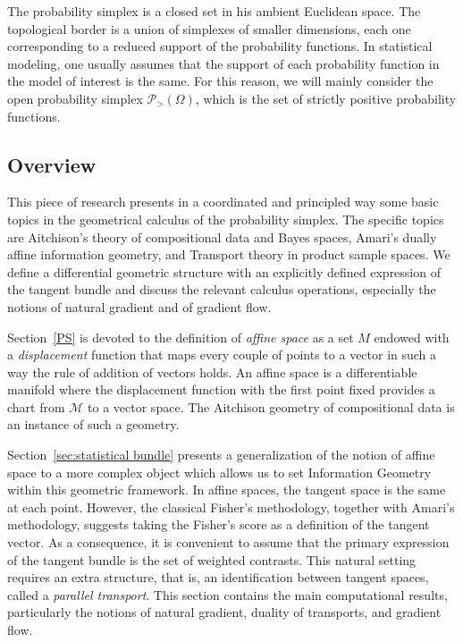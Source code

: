 \documentclass[axioms,article,submit,pdftex,moreauthors]{Definitions/mdpi}
\theoremstyle{plain}
\theoremstyle{remark}
\newcommand{\pdensitieson}[1]{\mathcal P_{>}\left(#1\right)}
\begin{document}
The probability simplex is a closed set in his ambient Euclidean space. The topological border is a union of simplexes of smaller dimensions, each one corresponding to a reduced support of the probability functions. In statistical modeling, one usually assumes that the support of each probability function in the model of interest is the same. For this reason, we will mainly consider the open probability simplex $\pdensitieson \Omega$, which is the set of strictly positive probability functions.


\subsection{Overview}

This piece of research presents in a coordinated and principled way some basic topics in the geometrical calculus of the probability simplex. The specific topics are Aitchison's theory of compositional data and Bayes spaces, Amari's dually affine information geometry, and Transport theory in product sample spaces. We define a differential geometric structure with an explicitly defined expression of the tangent bundle and discuss the relevant calculus operations, especially the notions of natural gradient and of gradient flow.

Section~\ref{PS} is devoted to the definition of \emph{affine space} as a set $M$ endowed with a \emph{displacement} function that maps every couple of points to a vector in such a way the rule of addition of vectors holds. An affine space is a differentiable manifold where the displacement function with the first point fixed provides a chart from $\mathcal{M}$ to a vector space. The Aitchison geometry of compositional data is an instance of such a geometry.

Section~\ref{sec:statistical bundle} presents a generalization of the notion of affine space to a more complex object which allows us to set Information Geometry within this geometric framework. In affine spaces, the tangent space is the same at each point. However, the classical Fisher's methodology, together with Amari's methodology, suggests taking the Fisher's score as a definition of the tangent vector. As a consequence, it is convenient to assume that the primary expression of the tangent bundle is the set of weighted contrasts. This natural setting requires an extra structure, that is, an identification between tangent spaces, called a \emph{parallel transport}. This section contains the main computational results, particularly the notions of natural gradient, duality of transports, and gradient flow.
\end{document}
